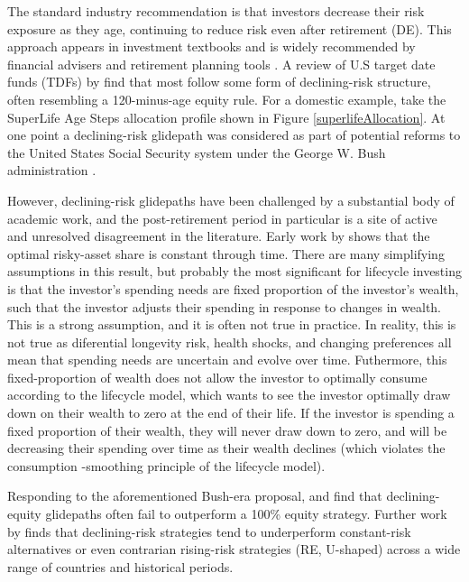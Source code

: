 \documentclass[11pt]{article}
\begin{document}
The standard industry recommendation is that investors decrease their risk exposure as they age, continuing to reduce risk even after retirement (DE). This approach appears in investment textbooks \parencite[e.g][]{bodie2023investments, bengen1996asset} and is widely recommended by financial advisers and retirement planning tools \parencite{choi2022popular}. A review of U.S target date funds (TDFs) by \textcite{dolvin2010asset} find that most follow some form of declining-risk structure, often resembling a 120-minus-age equity rule. For a domestic example, take the SuperLife Age Steps allocation profile shown in Figure \ref{superlifeAllocation}. At one point a declining-risk glidepath was considered as part of potential reforms to the United States Social Security system under the George W. Bush administration \parencite[see][]{shiller2005life, shiller2006lifecycleSocialSecurity}.

However, declining-risk glidepaths have been challenged by a substantial body of academic work, and the post-retirement period in particular is a site of active and unresolved disagreement in the literature. Early work by \textcite{merton1969lifetime} shows that the optimal risky-asset share is constant through time. There are many simplifying assumptions in this result, but probably the most significant for lifecycle investing is that the investor's spending needs are fixed proportion of the investor's wealth, such that the investor adjusts their spending in response to changes in wealth. This is a strong assumption, and it is often not true in practice. In reality, this is not true as diferential longevity risk, health shocks, and changing preferences all mean that spending needs are uncertain and evolve over time. Futhermore, this fixed-proportion of wealth does not allow the investor to optimally consume according to the lifecycle model, which wants to see the investor optimally draw down on their wealth to zero at the end of their life. If the investor is spending a fixed proportion of their wealth, they will never draw down to zero, and will be decreasing their spending over time as their wealth declines (which violates the consumption -smoothing principle of the lifecycle model). 

Responding to the aforementioned Bush-era proposal, \textcite{shiller2005life} and \textcite{shiller2006lifecycleSocialSecurity} find that declining-equity glidepaths often fail to outperform a 100\% equity strategy. Further work by \textcite{estrada2014glidepath, estrada2015retirement} finds that declining-risk strategies tend to underperform constant-risk alternatives or even contrarian rising-risk strategies (RE, U-shaped) across a wide range of countries and historical periods.
\end{document}

